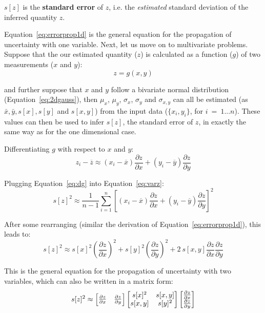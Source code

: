 $s[z]$ is the \textbf{standard error} of $z$, i.e.  the
\textit{estimated} standard deviation of the inferred quantity $z$.\medskip

Equation~\ref{eq:errorprop1d} is the general equation for the
propagation of uncertainty with one variable.  Next, let us move on to
multivariate problems. Suppose that the our estimated quantity ($z$)
is calculated as a function ($g$) of two measurements ($x$ and $y$):
\begin{equation}
z = g(x,y)
\label{eq:zfxy}
\end{equation}

\noindent and further suppose that $x$ and $y$ follow a bivariate
normal distribution (Equation~\ref{eq:2dgauss}), then $\mu_x$,
$\mu_{y}$, $\sigma_{x}$, $\sigma_{y}$ and $\sigma_{x,y}$ can all be
estimated (as $\bar{x}, \bar{y}, s[x], s[y]$ and $s[x,y]$) from the
input data ($\{x_i, y_i\}$, for $i~=~1...n$). These values can then be
used to infer $s[z]$, the standard error of $z$, in exactly the same
way as for the one dimensional case.\medskip

Differentiating $g$ with respect to $x$ and $y$:
\begin{equation}
  z_i - \overline{z} \approx (x_i-\overline{x}) \frac{\partial z}{\partial x} +
  (y_i-\overline{y}) \frac{\partial z}{\partial y}
  \label{eq:dg}
\end{equation}

Plugging Equation~\ref{eq:dg} into Equation~\ref{eq:varz}:
\begin{equation}
  s[z]^2 \approx \frac{1}{n-1} \sum_{i=1}^{n} \left[
    (x_i-\overline{x}) \frac{\partial z}{\partial x} +
    (y_i-\overline{y}) \frac{\partial z}{\partial y} \right]^2
\end{equation}

After some rearranging (similar the derivation of
Equation~\ref{eq:errorprop1d}), this leads to:
\begin{equation}
  s[z]^2 \approx s[x]^2 \left(\frac{\partial z}{\partial x}\right)^2 +
  s[y]^2 \left(\frac{\partial z}{\partial y}\right)^2 +
  2~s[x,y] \frac{\partial z}{\partial x} \frac{\partial z}{\partial y}
  \label{eq:errorprop2d}
\end{equation}

This is the general equation for the propagation of uncertainty with
two variables, which can also be written in a matrix form:
\begin{equation}
s[z]^2 \approx
\left[
  \begin{array}{@{}cc@{}}
\frac{\partial z}{\partial x} & \frac{\partial z}{\partial y}
\end{array}
\right]
\left[
\begin{array}{@{}cc@{}}
s[x]^2 & s[x,y]\\
s[x,y] & s[y]^2
\end{array}
\right]
\left[
\begin{array}{@{}c@{}}
\frac{\partial z}{\partial x} \\
\frac{\partial z}{\partial y}
\end{array}
\right]
\label{eq:errorprop2dmatrix}
\end{equation}

